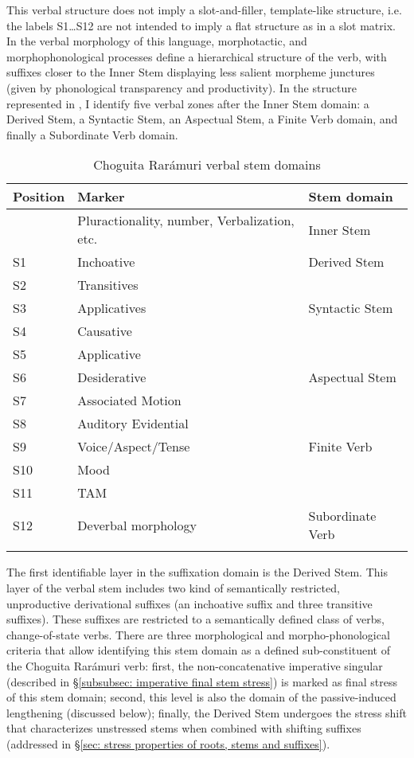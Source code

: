 This verbal structure does not imply a slot-and-filler, template-like structure, i.e. the labels S1\ldots S12 are not intended to imply a flat structure as in a slot matrix. In the verbal morphology of this language, morphotactic, and morphophonological processes define a hierarchical structure of the verb, with suffixes closer to the Inner Stem displaying less salient morpheme junctures (given by phonological transparency and productivity). In the structure represented in , I identify five verbal zones after the Inner Stem domain: a Derived Stem, a Syntactic Stem, an Aspectual Stem, a Finite Verb domain, and finally a Subordinate Verb domain.

\begin{table}
\caption{Choguita Rarámuri verbal stem domains}
\label{tab:verb-stem-levels}

\begin{tabularx}{\textwidth}{lQl}
\lsptoprule
\textbf{Position}  & \textbf{Marker}  & \textbf{Stem domain} \\
\midrule
{} & Pluractionality, number, Verbalization, etc. & Inner Stem\\
S1 & Inchoative & Derived Stem \\
S2 & Transitives & \\
S3 & Applicatives & Syntactic Stem\\
S4 & Causative & \\
S5 & Applicative & \\
S6 & Desiderative & Aspectual Stem\\
S7 & Associated Motion & \\
S8 & Auditory Evidential & \\
S9 & Voice/Aspect/Tense & Finite Verb\\
S10 & Mood & \\
S11 & TAM & \\
S12 & Deverbal morphology & Subordinate Verb\\
\lspbottomrule
\end{tabularx}
\end{table}

The first identifiable layer in the suffixation domain is the Derived Stem. This layer of the verbal stem includes two kind of semantically restricted, unproductive derivational suffixes (an inchoative suffix and three transitive suffixes). These suffixes are restricted to a semantically defined class of verbs, change-of-state verbs. There are three morphological and morpho-phonological criteria that allow identifying this stem domain as a defined sub-constituent of the Choguita Rarámuri verb: first, the non-concatenative imperative singular (described in §\ref{subsubsec: imperative final stem stress}) is marked as final stress of this stem domain; second, this level is also the domain of the passive-induced lengthening (discussed below); finally, the Derived Stem undergoes the stress shift that characterizes unstressed stems when combined with shifting suffixes (addressed in §\ref{sec: stress properties of roots, stems and suffixes}).


